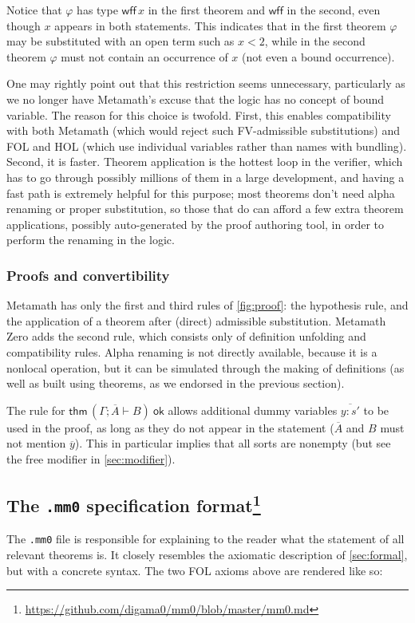 \documentclass[runningheads]{llncs}
\newcommand{\ok}{\ \mathsf{ok}}
\begin{document}
Notice that $\varphi$ has type $\mathsf{wff}\,x$ in the first theorem and $\mathsf{wff}$ in the second, even though $x$ appears in both statements. This indicates that in the first theorem $\varphi$ may be substituted with an open term such as $x<2$, while in the second theorem $\varphi$ must not contain an occurrence of $x$ (not even a bound occurrence).

One may rightly point out that this restriction seems unnecessary, particularly as we no longer have Metamath's excuse that the logic has no concept of bound variable. The reason for this choice is twofold. First, this enables compatibility with both Metamath (which would reject such FV-admissible substitutions) and FOL and HOL (which use individual variables rather than names with bundling). Second, it is faster. Theorem application is the hottest loop in the verifier, which has to go through possibly millions of them in a large development, and having a fast path is extremely helpful for this purpose; most theorems don't need alpha renaming or proper substitution, so those that do can afford a few extra theorem applications, possibly auto-generated by the proof authoring tool, in order to perform the renaming in the logic.

\subsubsection{Proofs and convertibility}
Metamath has only the first and third rules of \autoref{fig:proof}: the hypothesis rule, and the application of a theorem after (direct) admissible substitution. Metamath Zero adds the second rule, which consists only of definition unfolding and compatibility rules. Alpha renaming is not directly available, because it is a nonlocal operation, but it can be simulated through the making of definitions (as well as built using theorems, as we endorsed in the previous section).

The rule for $\mathsf{thm}\,(\Gamma;\overline{A}\vdash B)\ok$ allows additional dummy variables $\overline{y:s'}$ to be used in the proof, as long as they do not appear in the statement ($\overline{A}$ and $B$ must not mention $\overline{y}$). This in particular implies that all sorts are nonempty (but see the \textsf{free} modifier in \autoref{sec:modifier}).

\subsection[The \texttt{.mm0} specification format]{The \texttt{.mm0} specification format\footnote{
  \url{https://github.com/digama0/mm0/blob/master/mm0.md}
  }}\label{sec:mm0}
The \texttt{.mm0} file is responsible for explaining to the reader what the statement of all relevant theorems is. It closely resembles the axiomatic description of \autoref{sec:formal}, but with a concrete syntax. The two FOL axioms above are rendered like so:
\end{document}
